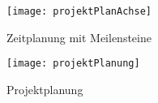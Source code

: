 \begin{figure}[htb!]
	\begin{center}
		\texttt{[image: projektPlanAchse]}
		\caption[Projektplanung Meilensteine]{Zeitplanung mit Meilensteine}
		\label{fig:projektPlanungAchse}
	\end{center}
\end{figure}


\begin{figure}[htb!]
	\begin{center}
		\texttt{[image: projektPlanung]}
		\caption[Projektplanung]{Projektplanung}
		\label{fig:projektPlanung}
	\end{center}
\end{figure}



\newpage
